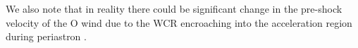 We also note that in reality there could be significant change in the pre-shock velocity of the O wind due to the WCR encroaching into the acceleration region during periastron \parencite{sugawaraSuzakuMonitoringWolf2015}.





